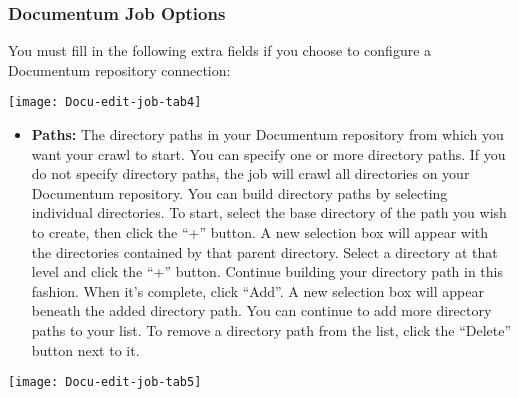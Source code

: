 %
%

\subsubsection{Documentum Job Options}

You must fill in the following extra fields if you choose to
configure a Documentum repository connection: 




\texttt{[image: Docu-edit-job-tab4]}

\begin{itemize}

\item \textbf{Paths:} The directory paths in your Documentum
repository from which you want your crawl to start. You can specify
one or more directory paths. If you do not specify directory paths,
the job will crawl all directories on your Documentum repository. You
can build directory paths by selecting individual directories. To
start, select the base directory of the path you wish to create, then
click the ``+'' button. A new selection box will appear with the
directories contained by that parent directory. Select a directory at
that level and click the ``+'' button. Continue building your
directory path in this fashion. When it's complete, click ``Add''. A
new selection box will appear beneath the added directory path. You
can continue to add more directory paths to your list. To remove a
directory path from the list, click the ``Delete'' button next to it.


\end{itemize}

\texttt{[image: Docu-edit-job-tab5]}

